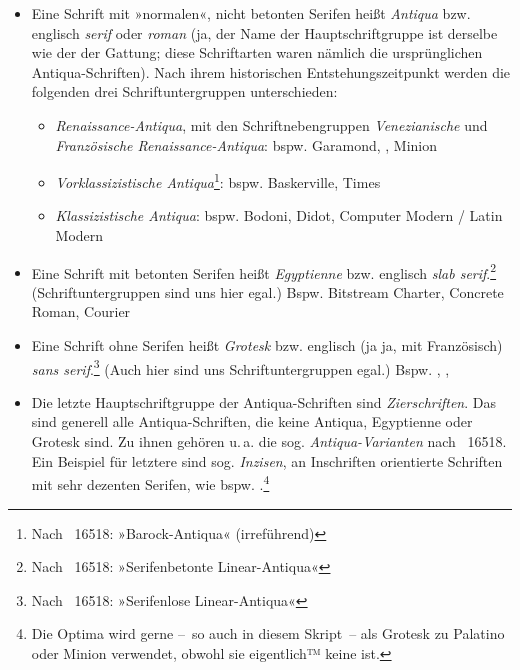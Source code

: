 \begin{itemize}
\item Eine Schrift mit »normalen«, nicht betonten Serifen heißt
  \emph{Antiqua} bzw. englisch \emph{\foreignlanguage{british}{serif}}
  oder \emph{\foreignlanguage{british}{roman}} (ja, der Name der
  Hauptschriftgruppe ist derselbe wie der der Gattung; diese
  Schriftarten waren nämlich die ursprünglichen Antiqua-Schriften).
  Nach ihrem historischen Entstehungszeitpunkt werden die folgenden
  drei Schriftuntergruppen unterschieden:
  \begin{itemize}
  \item \emph{Renaissance-Antiqua}, mit den Schriftnebengruppen
    \emph{Venezianische} und \emph{Französische Renaissance-Antiqua}:
    bspw. {\selectfont Garamond},
    {\selectfont {}}, %
    Minion
  \item \emph{Vorklassizistische Antiqua}\footnote{Nach
      ~16518: »Barock-Antiqua« (irreführend)}:
    bspw. {\selectfont Baskerville},
    {\selectfont Times} %
  \item \emph{Klassizistische Antiqua}:
    bspw. {\selectfont Bodoni},
    {\selectfont Didot},
    {\selectfont Computer Modern / Latin Modern}
  \end{itemize}
\item Eine Schrift mit betonten Serifen heißt \emph{Egyptienne} bzw.
  englisch \emph{\foreignlanguage{british}{slab serif}}.\footnote{Nach
    ~16518: »Serifenbetonte Linear-Antiqua«}
  (Schriftuntergruppen sind uns hier egal.)  Bspw.
  {\selectfont Bitstream Charter},
  {\selectfont Concrete Roman},
  {\selectfont Courier} %
\item Eine Schrift ohne Serifen heißt \emph{Grotesk} bzw. englisch (ja
  ja, mit Französisch) \emph{\foreignlanguage{british}{sans
      serif}}.\footnote{Nach ~16518: »Serifenlose
    Linear-Antiqua«} (Auch hier sind uns Schriftuntergruppen egal.)
  Bspw.  {\selectfont {}}, %
  {\selectfont {}}, %
  {\selectfont {}} %
\item Die letzte Hauptschriftgruppe der Antiqua-Schriften sind
  \emph{Zierschriften}.  Das sind generell alle Antiqua-Schriften, die
  keine Antiqua, Egyptienne oder Grotesk sind. Zu ihnen gehören
  u.\,a. die sog. \emph{Antiqua-Varianten} nach ~16518.  Ein
  Beispiel für letztere sind sog. \emph{Inzisen}, an Inschriften
  orientierte Schriften mit sehr dezenten Serifen, wie bspw.
  \textsf{}.\footnote{Die Optima
    wird gerne --~so auch in diesem Skript~-- als Grotesk zu Palatino
    oder Minion verwendet, obwohl sie eigentlich™ keine ist.}
\end{itemize}
